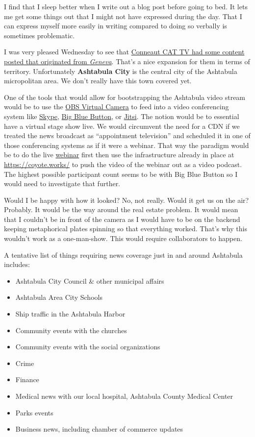 I find that I sleep better when I write out a blog post before going to
bed. It lets me get some things out that I might not have expressed
during the day. That I can express myself more easily in writing
compared to doing so verbally is sometimes problematic.

I was very pleased Wednesday to see that
\href{https://vimeo.com/801229997}{Conneaut CAT TV had some content
posted that originated from \emph{Geneva}}. That's a nice expansion for
them in terms of territory. Unfortunately \textbf{Ashtabula City} is the
central city of the Ashtabula micropolitan area. We don't really have
this town covered yet.

One of the tools that would allow for bootstrapping the Ashtabula video
stream would be to use the
\href{https://obsproject.com/kb/virtual-camera-guide}{OBS Virtual
Camera} to feed into a video conferencing system like
\href{https://www.skype.com/en/free-conference-call/}{Skype},
\href{https://bigbluebutton.org/}{Big Blue Button}, or
\href{https://jitsi.org/}{Jitsi}. The notion would be to essential have
a virtual stage show live. We would circumvent the need for a CDN if we
treated the news broadcast as ``appointment television'' and scheduled
it in one of those conferencing systems as if it were a webinar. That
way the paradigm would be to do the live
\href{https://en.wikipedia.org/w/index.php?title=Web_conferencing&oldid=1137551617}{webinar}
first then use the infrastructure already in place at
\url{https://coyote.works/} to push the video of the webinar out as a
video podcast. The highest possible participant count seems to be with
Big Blue Button so I would need to investigate that further.

Would I be happy with how it looked? No, not really. Would it get us on
the air? Probably. It would be the way around the real estate problem.
It would mean that I couldn't be in front of the camera as I would have
to be on the backend keeping metaphorical plates spinning so that
everything worked. That's why this wouldn't work as a one-man-show. This
would require collaborators to happen.

A tentative list of things requiring news coverage just in and around
Ashtabula includes:

\begin{itemize}
\tightlist
\item
  Ashtabula City Council \& other municipal affairs
\item
  Ashtabula Area City Schools
\item
  Ship traffic in the Ashtabula Harbor
\item
  Community events with the churches
\item
  Community events with the social organizations
\item
  Crime
\item
  Finance
\item
  Medical news with our local hospital, Ashtabula County Medical Center
\item
  Parks events
\item
  Business news, including chamber of commerce updates
\end{itemize}

